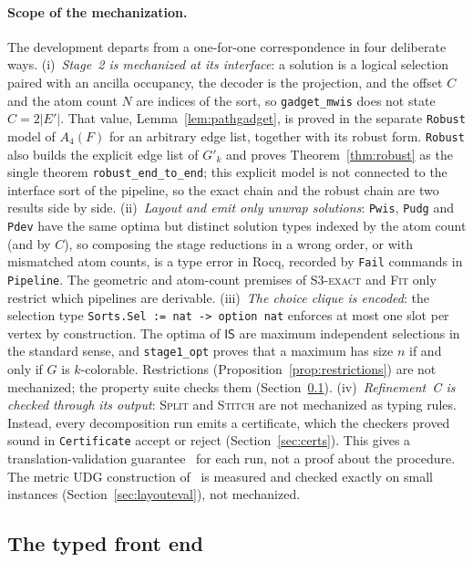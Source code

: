 \documentclass[a4paper,fleqn]{cas-sc}
\newcommand{\tIS}{\mathsf{IS}}
\newcommand{\rn}[1]{\textup{\textsc{\footnotesize #1}}}
\begin{document}
\paragraph{Scope of the mechanization.} The development departs from a one-for-one
correspondence in four deliberate ways.
(i)~\emph{Stage~2 is mechanized at its interface}: a solution is a logical selection
paired with an ancilla occupancy, the decoder is the projection, and the offset $C$ and
the atom count $N$ are indices of the sort, so \texttt{gadget\_mwis} does not state
$C=2|E'|$. That value, Lemma~\ref{lem:pathgadget}, is proved in the separate
\texttt{Robust} model of $A_4(F)$ for an arbitrary edge list, together with its robust
form. \texttt{Robust} also builds the explicit edge list of $G'_k$ and proves
Theorem~\ref{thm:robust} as the single theorem \texttt{robust\_end\_to\_end}; this
explicit model is not connected to the interface sort of the pipeline, so the exact
chain and the robust chain are two results side by side.
(ii)~\emph{Layout and emit only unwrap solutions}: \texttt{Pwis}, \texttt{Pudg} and
\texttt{Pdev} have the same optima but distinct solution types indexed by the atom
count (and by $C$), so composing the stage reductions in a wrong order, or with
mismatched atom counts, is a type error in Rocq, recorded by \texttt{Fail} commands in
\texttt{Pipeline}. The geometric and atom-count premises of \rn{S3-exact} and \rn{Fit}
only restrict which pipelines are derivable.
(iii)~\emph{The choice clique is encoded}: the selection type
\texttt{Sorts.Sel := nat -> option nat} enforces at most one slot per vertex by
construction. The optima of $\tIS$ are maximum independent selections in the standard
sense, and \texttt{stage1\_opt} proves that a maximum has size $n$ if and only if $G$
is $k$-colorable. Restrictions (Proposition~\ref{prop:restrictions}) are not
mechanized; the property suite checks them (Section~\ref{sec:haskell}).
(iv)~\emph{Refinement~C is checked through its output}: \rn{Split} and \rn{Stitch}
are not mechanized as typing rules. Instead, every decomposition run emits a
certificate, which the checkers proved sound in \texttt{Certificate} accept or reject
(Section~\ref{sec:certs}). This gives a translation-validation
guarantee~\cite{Pnueli1998} for each run, not a proof about the procedure. The metric UDG construction of~\cite{Nguyen2023} is
measured and checked exactly on small instances (Section~\ref{sec:layouteval}), not
mechanized.

\subsection{The typed front end}
\label{sec:haskell}
\end{document}
